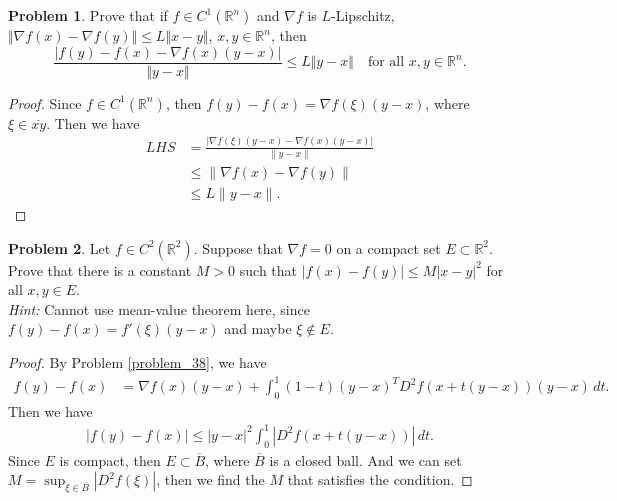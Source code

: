\documentclass[11pt]{article}
\theoremstyle{definition}
\newtheorem{problem}{Problem}
\theoremstyle{definition}
\begin{document}
\medskip

\begin{problem}
Prove that if $f\in C^1(\mathbb{R}^n)$ and $\nabla f$ is $L$-Lipschitz, $\Vert \nabla f(x)-\nabla f(y)\Vert\leq L\Vert x-y\Vert$, $x,y\in\mathbb{R}^n$, then
$$
\frac{|f(y)-f(x)-\nabla f(x)(y-x)|}{\Vert y-x\Vert}\leq L\Vert y-x\Vert
\quad
\text{for all $x,y\in\mathbb{R}^n$.}
$$
\end{problem}
\begin{proof}
Since $f\in C^1(\mathbb{R}^n)$, then $f(y) - f(x) = \nabla f(\xi)(y - x)$, where $\xi \in \overline{xy}$. Then we have
\begin{align*}
    LHS & = \frac{\left|\nabla f(\xi)(y - x) - \nabla f(x)(y-x) \right|}{\|y-x\|} \\
    & \leq \| \nabla f(x)-\nabla f(y)\|  \\
    & \leq L \|y-x\|.
\end{align*}
\end{proof}

\medskip

\begin{problem}
Let $f\in C^2(\mathbb{R}^2)$. Suppose that $\nabla f=0$ on a compact set
$E\subset\mathbb{R}^2$. Prove that there is a constant $M>0$ such that
$|f(x)-f(y)|\leq M|x-y|^2$ for all $x,y\in E$. \\
{\em Hint:} Cannot use mean-value theorem here, since $f(y) - f(x) = f'(\xi)(y-x)$ and maybe $\xi \notin E$.
\end{problem}
\begin{proof}
By Problem \ref{problem_38}, we have
\begin{align*}
    f(y) - f(x) & = \nabla f(x)(y-x) + \int^1_0 (1-t) (y-x)^T D^2f(x+t(y-x)) (y-x)\, dt.
\end{align*}
Then we have 
\begin{align*}
    \left|f(y) - f(x)\right| \leq  |y-x|^2 \int^1_0 \left|D^2f(x+t(y-x))\right|\, dt.
\end{align*}
Since $E$ is compact, then $E \subset \overline{B}$, where $\overline{B}$ is a closed ball. And we can set $M = \sup_{\xi \in \overline{B}}\left|D^2 f(\xi)\right|$, then we find the $M$ that satisfies the condition.
\end{proof}

\medskip
\end{document}
